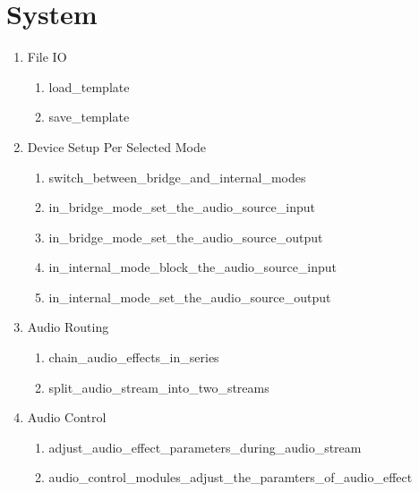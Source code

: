 \section{System}

\begin{enumerate}
	\item File IO
	\begin{enumerate}
		\item load\_template
		\item save\_template
	\end{enumerate}

	\item Device Setup Per Selected Mode
	\begin{enumerate}
		\item switch\_between\_bridge\_and\_internal\_modes
		\item in\_bridge\_mode\_set\_the\_audio\_source\_input
		\item in\_bridge\_mode\_set\_the\_audio\_source\_output
		\item in\_internal\_mode\_block\_the\_audio\_source\_input
		\item in\_internal\_mode\_set\_the\_audio\_source\_output
	\end{enumerate}


	\item Audio Routing
	\begin{enumerate}
		\item chain\_audio\_effects\_in\_series
		\item split\_audio\_stream\_into\_two\_streams

	\end{enumerate}

	\item Audio Control
	\begin{enumerate}
		\item adjust\_audio\_effect\_parameters\_during\_audio\_stream
		\item audio\_control\_modules\_adjust\_the\_paramters\_of\_audio\_effect
	\end{enumerate}





\end{enumerate}